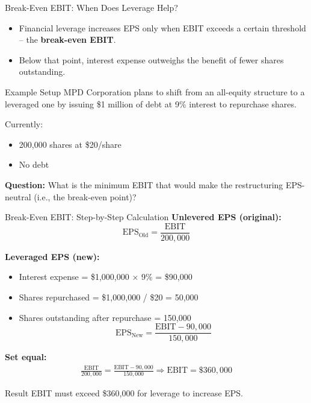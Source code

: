 \begin{frame}{Break-Even EBIT: When Does Leverage Help?}
	
	\begin{itemize}
		\item Financial leverage increases EPS only when EBIT exceeds a certain threshold -- the \textbf{break-even EBIT}.
		\item Below that point, interest expense outweighs the benefit of fewer shares outstanding.
	\end{itemize}
	
	\begin{block}{Example Setup}
		MPD Corporation plans to shift from an all-equity structure to a leveraged one by issuing \$1 million of debt at 9\% interest to repurchase shares.  
		\vspace{1mm}
		
		Currently:  
		\begin{itemize}
			\item 200,000 shares at \$20/share  
			\item No debt  
		\end{itemize}
		
		\textbf{Question:}  
		What is the minimum EBIT that would make the restructuring EPS-neutral (i.e., the break-even point)?
	\end{block}
	
\end{frame}

\begin{frame}{Break-Even EBIT: Step-by-Step Calculation}
	\small
	\textbf{Unlevered EPS (original):}
	\[
	\text{EPS}_\text{Old} = \frac{\text{EBIT}}{200{,}000}
	\]
	
	\textbf{Leveraged EPS (new):}
	\begin{itemize}
		\item Interest expense = \$1,000,000 × 9\% = \$90,000
		\item Shares repurchased = \$1,000,000 / \$20 = 50,000
		\item Shares outstanding after repurchase = 150,000
		\[
		\text{EPS}_\text{New} = \frac{\text{EBIT} - 90{,}000}{150{,}000}
		\]
	\end{itemize}
	

	\textbf{Set equal:}
	\begin{align*}
		\frac{\text{EBIT}}{200{,}000} = \frac{\text{EBIT} - 90{,}000}{150{,}000} 
		\Rightarrow \text{EBIT} = \$360{,}000
	\end{align*}
	\vspace{-0.4cm}
	\begin{alertblock}{Result}
		EBIT must exceed \$360,000 for leverage to increase EPS.
	\end{alertblock}
	
\end{frame}

